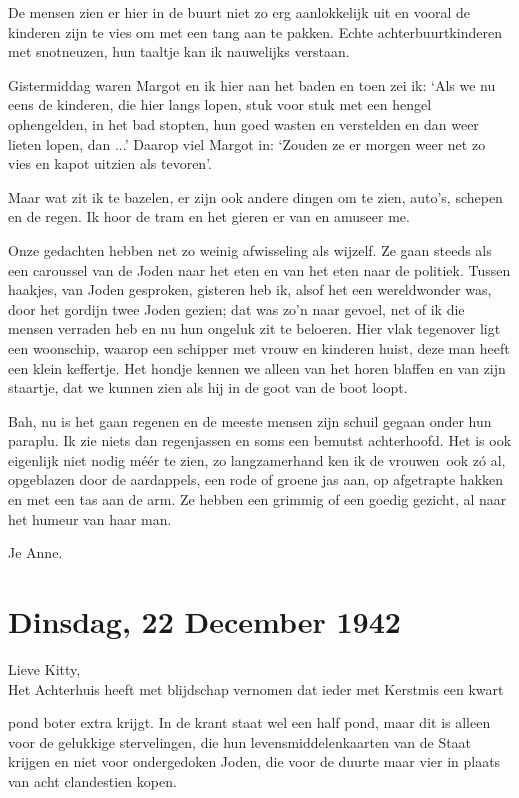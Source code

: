 \documentclass{book}
\begin{document}
De mensen zien er hier in de buurt niet zo erg aanlokkelijk uit en
vooral de kinderen zijn te vies om met een tang aan te pakken. Echte
achterbuurtkinderen met snotneuzen, hun taaltje kan ik nauwelijks
verstaan.

Gistermiddag waren Margot en ik hier aan het baden en toen zei ik: `Als
we nu eens de kinderen, die hier langs lopen, stuk voor stuk met een
hengel ophengelden, in het bad stopten, hun goed wasten en verstelden en
dan weer lieten lopen, dan ...' Daarop viel Margot in: `Zouden ze er
morgen weer net zo vies en kapot uitzien als tevoren'.

Maar wat zit ik te bazelen, er zijn ook andere dingen om te zien,
auto's, schepen en de regen. Ik hoor de tram en het gieren er van en
amuseer me.

Onze gedachten hebben net zo weinig afwisseling als wijzelf. Ze gaan
steeds als een caroussel van de Joden naar het eten en van het eten naar
de politiek. Tussen haakjes, van Joden gesproken, gisteren heb ik, alsof
het een wereldwonder was, door het gordijn twee Joden gezien; dat was
zo'n naar gevoel, net of ik die mensen verraden heb en nu hun ongeluk
zit te beloeren. Hier vlak tegenover ligt een woonschip, waarop een
schipper met vrouw en kinderen huist, deze man heeft een klein
keffertje. Het hondje kennen we alleen van het horen blaffen en van zijn
staartje, dat we kunnen zien als hij in de goot van de boot loopt.

Bah, nu is het gaan regenen en de meeste mensen zijn schuil gegaan onder
hun paraplu. Ik zie niets dan regenjassen en soms een bemutst
achterhoofd. Het is ook eigenlijk niet nodig méér te zien, zo
langzamerhand ken ik de vrouwen~ook zó al, opgeblazen door de
aardappels, een rode of groene jas aan, op afgetrapte hakken en met een
tas aan de arm. Ze hebben een grimmig of een goedig gezicht, al naar het
humeur van haar man.

Je Anne.

\chapter{Dinsdag, 22 December 1942}

Lieve Kitty,\\Het Achterhuis heeft met blijdschap vernomen dat ieder met
Kerstmis een kwart

pond boter extra krijgt. In de krant staat wel een half pond, maar dit
is alleen voor de gelukkige stervelingen, die hun levensmiddelenkaarten
van de Staat krijgen en niet voor ondergedoken Joden, die voor de duurte
maar vier in plaats van acht clandestien kopen.
\end{document}
